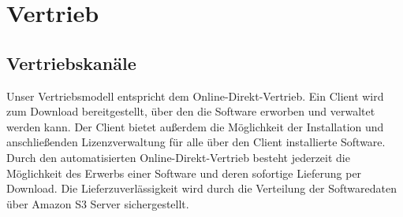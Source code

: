 \chapter{Vertrieb}
\section{Vertriebskan\"ale}
	
Unser Vertriebsmodell entspricht dem Online-Direkt-Vertrieb. Ein Client wird zum Download bereitgestellt, über den die  Software erworben und verwaltet werden kann. Der Client bietet außerdem die Möglichkeit der Installation und anschließenden Lizenzverwaltung für alle über den Client installierte Software.  Durch den automatisierten Online-Direkt-Vertrieb besteht jederzeit die Möglichkeit des Erwerbs einer Software und deren sofortige Lieferung per Download. Die Lieferzuverlässigkeit wird durch die Verteilung der Softwaredaten über Amazon S3 Server sichergestellt.


